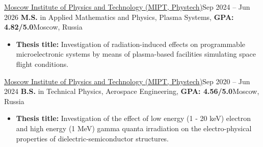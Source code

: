 \resumeSubHeadingListStart
    \resumeSubheading
        {\href{https://mipt.ru/}{Moscow Institute of Physics and Technology (MIPT, Phystech)}}{Sep 2024 -- Jun 2026}
        {\textbf{M.S.} in Applied Mathematics and Physics, Plasma Systems, \textbf{GPA: 4.82/5.0}}{Moscow, Russia}
        \begin{itemize}
            \item{\resumeitemfont \textbf{Thesis title:} Investigation of radiation-induced effects on programmable microelectronic systems by means of plasma-based facilities simulating space flight conditions.}
        \end{itemize}
    \resumeSubheading
        {\href{https://mipt.ru/}{Moscow Institute of Physics and Technology (MIPT, Phystech)}}{Sep 2020 -- Jun 2024}
        {\textbf{B.S.} in Technical Physics, Aerospace Engineering, \textbf{GPA: 4.56/5.0}}{Moscow, Russia}
        \begin{itemize}
            \item{\resumeitemfont \textbf{Thesis title:} Investigation of the effect of low energy (1 - 20 keV) electron and high energy (1 MeV) gamma quanta irradiation on the electro-physical properties of dielectric-semiconductor structures.}
        \end{itemize}
\resumeSubHeadingListEnd

